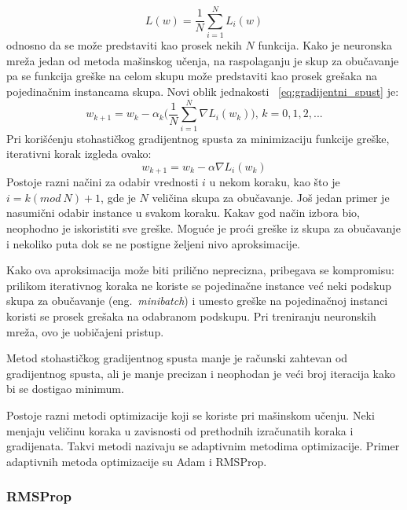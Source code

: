 \begin{equation}
		L(w) = \frac{1}{N}\sum_{i=1}^{N} L_i(w)	
\end{equation}
odnosno da se može predstaviti kao prosek nekih $N$ funkcija. Kako je neuronska mreža jedan od metoda mašinskog učenja, na raspolaganju je skup za obučavanje pa se funkcija greške na celom skupu može predstaviti kao prosek grešaka na pojedinačnim instancama skupa. Novi oblik 
jednakosti ~\eqref{eq:gradijentni_spust} je:
\begin{equation}
	w_{k+1} = w_k - \alpha_k \bigg( \frac{1}{N}\sum_{i=1}^{N} \nabla L_i(w_k) \bigg)\text{,~} k=0,1,2, ... 
\end{equation}
Pri korišćenju stohastičkog gradijentnog spusta za minimizaciju funkcije greške, iterativni korak izgleda ovako:
\begin{equation}
	w_{k+1} = w_k - \alpha \nabla L_i(w_k) 
\end{equation}
Postoje razni načini za odabir vrednosti $i$ u nekom koraku, kao što je $i=k (mod~N) + 1$, gde je $N$ veličina skupa za obučavanje. Još jedan primer je nasumični odabir instance u svakom koraku. Kakav god način izbora bio, neophodno je iskoristiti sve greške. Moguće je proći greške iz skupa za obučavanje i nekoliko puta dok se ne postigne željeni nivo aproksimacije. 
\par
Kako ova aproksimacija može biti prilično neprecizna, pribegava se kompromisu: prilikom iterativnog koraka ne koriste se pojedinačne instance već neki podskup skupa za obučavanje (eng.~{\em minibatch}) i umesto greške na pojedinačnoj instanci koristi se prosek grešaka na odabranom podskupu. Pri treniranju neuronskih mreža, ovo je uobičajeni pristup.
\par
Metod stohastičkog gradijentnog spusta manje je računski zahtevan od gradijentnog spusta, ali je manje precizan i neophodan je veći broj iteracija kako bi se dostigao minimum.
\par
Postoje razni metodi optimizacije koji se koriste pri mašinskom učenju. Neki menjaju veličinu koraka u zavisnosti od prethodnih izračunatih koraka i gradijenata. Takvi metodi nazivaju se adaptivnim metodima optimizacije. Primer adaptivnih metoda optimizacije su Adam i RMSProp.

\subsubsection{RMSProp}
\label{sss:rmsprop}

